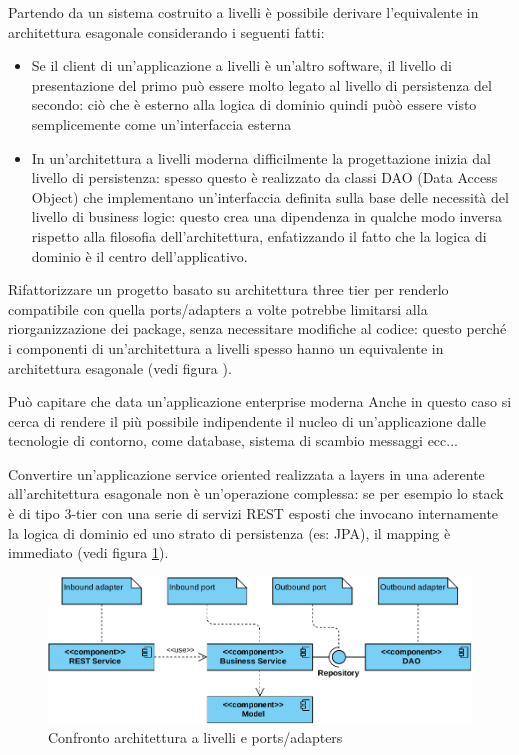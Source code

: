 Partendo da un sistema costruito a livelli è possibile derivare l'equivalente in architettura esagonale considerando i seguenti fatti:
\begin{itemize}
	\item Se il client di un'applicazione a livelli è un'altro software, il livello di presentazione del primo può essere molto legato al livello di persistenza del secondo: ciò che è esterno alla logica di dominio quindi puòò essere visto semplicemente come un'interfaccia esterna
	\item In un'architettura a livelli moderna difficilmente la progettazione inizia dal livello di persistenza: spesso questo è realizzato da classi DAO (Data Access Object) che implementano un'interfaccia definita sulla base delle necessità del livello di business logic: questo crea una dipendenza in qualche modo inversa rispetto alla filosofia dell'architettura, enfatizzando il fatto che la logica di dominio è il centro dell'applicativo.
\end{itemize}

Rifattorizzare un progetto basato su architettura three tier per renderlo compatibile con quella ports/adapters a volte potrebbe limitarsi alla riorganizzazione dei package, senza necessitare modifiche al codice: questo perché i componenti di un'architettura a livelli spesso hanno un equivalente in architettura esagonale (vedi figura ).

Può capitare che data un'applicazione enterprise moderna
Anche in questo caso si cerca di rendere il più possibile indipendente il nucleo di un'applicazione dalle tecnologie di contorno, come database, sistema di scambio messaggi ecc...

Convertire un'applicazione service oriented realizzata a layers in una aderente all'architettura esagonale non è un'operazione complessa: se per esempio lo stack è di tipo 3-tier con una serie di servizi REST esposti che invocano internamente la logica di dominio ed uno strato di persistenza (es: JPA), il mapping è immediato (vedi figura \ref{fig:layered-hexagonal}).

\begin{figure}[h]
	\centering
	\includegraphics[width=\textwidth]{img/layered-hexagonal}
	\caption{Confronto architettura a livelli e ports/adapters}
	\label{fig:layered-hexagonal}
\end{figure}

